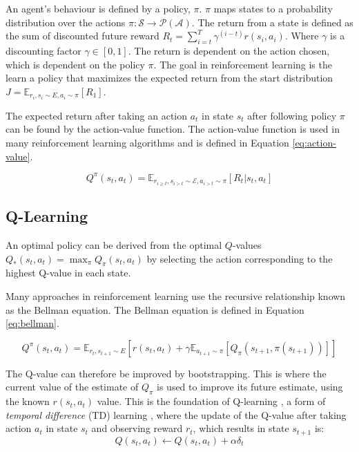 \documentclass[conference]{IEEEtran}
\begin{document}
An agent's behaviour is defined by a policy, $\pi$. $\pi$ maps states to a probability distribution over the actions $\pi:\mathcal{S}\rightarrow \mathcal{P}(\mathcal{A})$. The return from a state is defined as the sum of discounted future reward $R_t=\sum_{i=t}^T\gamma^{(i-t)}r(s_i,a_i)$. Where $\gamma$ is a discounting factor $\gamma \in [0,1]$. The return is dependent on the action chosen, which is dependent on the policy $\pi$. The goal in reinforcement learning is the learn a policy that maximizes the expected return from the start distribution $J=\mathbb{E}_{r_i,s_i \sim E,a_i \sim \pi}[R_1]$. 

The expected return after taking an action $a_t$ in state $s_t$ after following policy $\pi$ can be found by the action-value function. The action-value function is used in many reinforcement learning algorithms and is defined in Equation \ref{eq:action-value}.

\begin{equation}
	\label{eq:action-value}
	Q^{\pi}(s_t,a_t)=\mathbb{E}_{r_{i\geq t},s_{i>t}\sim \mathcal{E},a_{i>t}\sim\pi}[R_t|s_t,a_t]
\end{equation}


\subsection{Q-Learning}

 An optimal policy can be derived from the optimal $Q$-values $Q_*(s_t,a_t)=\max_\pi Q_\pi(s_t,a_t)$ by selecting the action corresponding to the highest Q-value in each state.

Many approaches in reinforcement learning use the recursive relationship known as the Bellman equation. The Bellman equation is defined in Equation \ref{eq:bellman}.

\begin{equation}
	\label{eq:bellman}
	Q^\pi(s_t,a_t)=\mathbb{E}_{{r_t},s_{t+1}\sim E} [r(s_t,a_t)+\gamma\mathbb{E}_{a_{t+1}\sim \pi}[Q_\pi(s_{t+1},\pi(s_{t+1}))]]
\end{equation}

\noindent The Q-value can therefore be improved by bootstrapping. This is where the current value of the estimate of $Q_\pi$ is used to improve its future estimate, using the known $r(s_t,a_t)$ value. This is the foundation of Q-learning \cite{Gay2007}, a form of \textit{temporal difference} (TD) learning \cite{Sutton2015}, where the update of the Q-value after taking action $a_t$ in state $s_t$ and observing reward $r_t$, which results in state $s_{t+1}$ is:
\begin{equation}
	Q(s_t,a_t)\leftarrow Q(s_t,a_t)+\alpha\delta_t
\end{equation}
\end{document}
